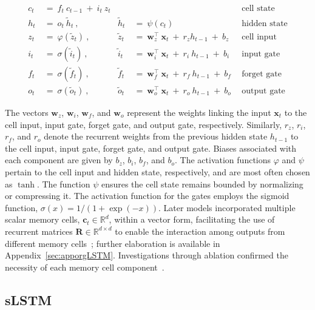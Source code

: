 \begin{align}
c_t \ &= \  f_t \ c_{t-1} \ + \ i_t \ z_t &  & &\text{cell state} \\
h_t  \ &= \ o_t \ \tilde{h}_t \ , & \tilde{h}_t \ &= \ \psi \left( c_t\right)
  &\text{hidden state} \\
z_t \ &= \ \varphi \left( \tilde{z}_t \right) \ , 
  &\tilde{z}_t \ &=  \ \mathbf{w}^\top_{z} \ \mathbf{x}_t \ + \
  r_{z}  h_{t-1} \ + \  b_{z} \ \
  &\text{cell input} \\
i_t \ &= \ \sigma \left( \tilde{i}_t  \right) \ , 
  &\tilde{i}_t \ &= \ \mathbf{w}^\top_{i} \ \mathbf{x}_t \ + \
  r_{i}  \ h_{t-1} \ + \  b_{i} \ \
  &\text{input gate} \\
f_t \ &= \ \sigma \left(  \tilde{f}_t \right) \ , 
  &\tilde{f}_t \ &= \ \mathbf{w}^\top_{f} \ \mathbf{x}_t  \ + \
  r_{f}  \ h_{t-1} \ + \  b_{f} \ \
  &\text{forget gate} \\
o_t \ &= \ \sigma \left( \tilde{o}_t \right) \ , 
  &\tilde{o}_t  \ &= \ \mathbf{w}^\top_{o} \ \mathbf{x}_t \ + \
  r_{o}  \ h_{t-1} \ + \  b_{o} \ \
  &\text{output gate} 
\end{align}

The vectors $\mathbf{w}_{z}$, $\mathbf{w}_{i}$, $\mathbf{w}_{f}$, and $\mathbf{w}_{o}$ represent the weights linking the input $\mathbf{x}_t$ to the cell input, input gate, forget gate, and output gate, respectively. Similarly, $r_{z}$, $r_{i}$, $r_{f}$, and $r_{o}$ denote the recurrent weights from the previous hidden state $h_{t-1}$ to the cell input, input gate, forget gate, and output gate. Biases associated with each component are given by $b_{z}$, $b_{i}$, $b_{f}$, and $b_{o}$. The activation functions $\varphi$ and $\psi$ pertain to the cell input and hidden state, respectively, and are most often chosen as $\tanh$. The function $\psi$ ensures the cell state remains bounded by normalizing or compressing it. The activation function for the gates employs the sigmoid function, $\sigma \left( x \right)= 1/(1+\exp(-x))$. Later models incorporated multiple scalar memory cells, $\mathbf{c}_t \in \mathbb{R}^{d}$, within a vector form, facilitating the use of recurrent matrices $\mathbf{R} \in \mathbb{R}^{d \times d}$ to enable the interaction among outputs from different memory cells~\citep{Greff:15}; further elaboration is available in Appendix~\ref{sec:apporgLSTM}. Investigations through ablation confirmed the necessity of each memory cell component~\citep{Greff:15}.

\subsection{sLSTM}
\label{sec:sLSTM}

